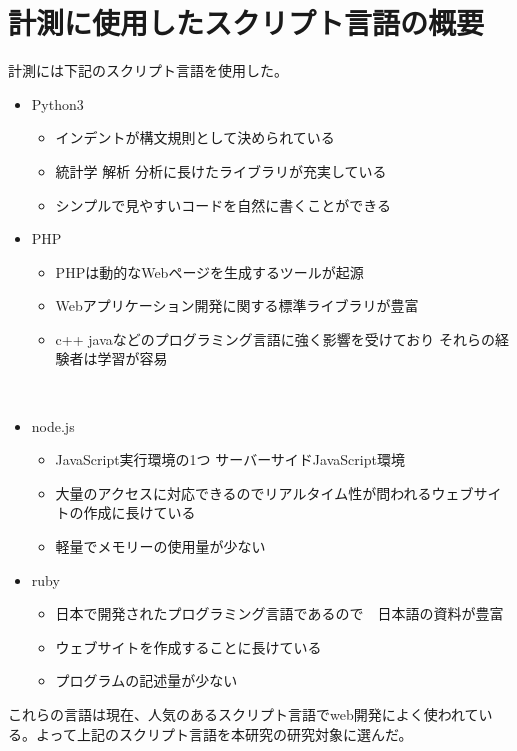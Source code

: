 \chapter{計測に使用したスクリプト言語の概要}
\label{cha:script-language}
計測には下記のスクリプト言語を使用した。
\begin{itemize}
  \item Python3
    \begin{itemize}
      \item インデントが構文規則として決められている
      \item 統計学 解析 分析に長けたライブラリが充実している
      \item シンプルで見やすいコードを自然に書くことができる
    \end{itemize}
  \item PHP
    \begin{itemize}
      \item PHPは動的なWebページを生成するツールが起源
      \item Webアプリケーション開発に関する標準ライブラリが豊富
      \item c++ javaなどのプログラミング言語に強く影響を受けており それらの経験者は学習が容易
    \end{itemize}
　\item node.js
    \begin{itemize}
      \item JavaScript実行環境の1つ サーバーサイドJavaScript環境
      \item 大量のアクセスに対応できるのでリアルタイム性が問われるウェブサイトの作成に長けている
      \item 軽量でメモリーの使用量が少ない
    \end{itemize}
  \item ruby
    \begin{itemize}
      \item 日本で開発されたプログラミング言語であるので　日本語の資料が豊富
      \item ウェブサイトを作成することに長けている
      \item プログラムの記述量が少ない
    \end{itemize}
\end{itemize}
これらの言語は現在、人気のあるスクリプト言語でweb開発によく使われている。よって上記のスクリプト言語を本研究の研究対象に選んだ。
